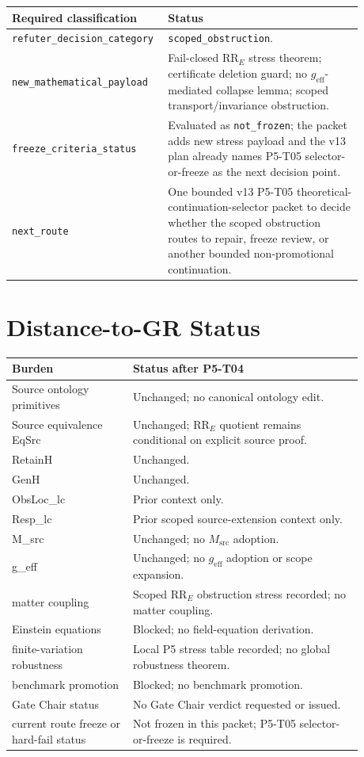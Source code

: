 \documentclass[11pt]{article}
\newcommand{\RRE}{\mathrm{RR}_{E}}
\newcommand{\geff}{g_{\mathrm{eff}}}
\begin{document}
\begin{longtable}{p{0.34\linewidth}p{0.54\linewidth}}
\toprule
Required classification & Status \\
\midrule
\texttt{refuter\_decision\_category} &
\texttt{scoped\_obstruction}. \\
\texttt{new\_mathematical\_payload} &
Fail-closed \(\RRE\) stress theorem; certificate deletion guard; no
\(\geff\)-mediated collapse lemma; scoped transport/invariance obstruction. \\
\texttt{freeze\_criteria\_status} &
Evaluated as \texttt{not\_frozen}; the packet adds new stress payload and the
v13 plan already names P5-T05 selector-or-freeze as the next decision point. \\
\texttt{next\_route} &
One bounded v13 P5-T05 theoretical-continuation-selector packet to decide
whether the scoped obstruction routes to repair, freeze review, or another
bounded non-promotional continuation. \\
\bottomrule
\end{longtable}

\section{Distance-to-GR Status}

\begin{longtable}{p{0.30\linewidth}p{0.58\linewidth}}
\toprule
Burden & Status after P5-T04 \\
\midrule
Source ontology primitives & Unchanged; no canonical ontology edit. \\
Source equivalence EqSrc & Unchanged; \(\RRE\) quotient remains conditional on explicit source proof. \\
RetainH & Unchanged. \\
GenH & Unchanged. \\
ObsLoc\_lc & Prior context only. \\
Resp\_lc & Prior scoped source-extension context only. \\
M\_src & Unchanged; no \(M_{\mathrm{src}}\) adoption. \\
g\_eff & Unchanged; no \(\geff\) adoption or scope expansion. \\
matter coupling & Scoped \(\RRE\) obstruction stress recorded; no matter coupling. \\
Einstein equations & Blocked; no field-equation derivation. \\
finite-variation robustness & Local P5 stress table recorded; no global robustness theorem. \\
benchmark promotion & Blocked; no benchmark promotion. \\
Gate Chair status & No Gate Chair verdict requested or issued. \\
current route freeze or hard-fail status & Not frozen in this packet; P5-T05 selector-or-freeze is required. \\
\bottomrule
\end{longtable}
\end{document}

